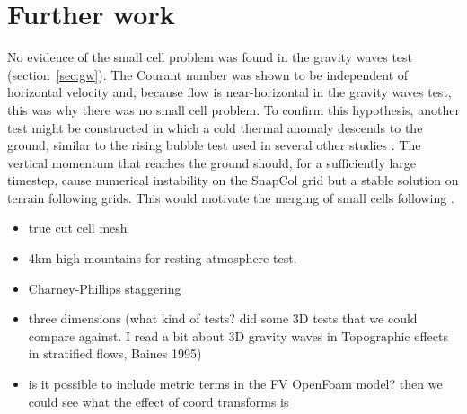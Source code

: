\chapter{Further work}

No evidence of the small cell problem was found in the gravity waves test (section~\ref{sec:gw}).  The Courant number was shown to be independent of horizontal velocity and, because flow is near-horizontal in the gravity waves test, this was why there was no small cell problem.  To confirm this hypothesis, another test might be constructed in which a cold thermal anomaly descends to the ground, similar to the rising bubble test used in several other studies \parencites{bonaventura2000}{jebens2011}{good2013}.  The vertical momentum that reaches the ground should, for a sufficiently large timestep, cause numerical instability on the SnapCol grid but a stable solution on terrain following grids.  This would motivate the merging of small cells following \textcite{yamazaki-satomura2010}.

\begin{itemize}
\item true cut cell mesh
\item 4km high mountains for resting atmosphere test.
\item Charney-Phillips staggering
\item three dimensions (what kind of tests?  \textcite{lock2012} did some 3D tests that we could compare against.  I read a bit about 3D gravity waves in Topographic effects in stratified flows, Baines 1995) 
\item is it possible to include metric terms in the FV OpenFoam model?  then we could see what the effect of coord transforms is
\end{itemize}
